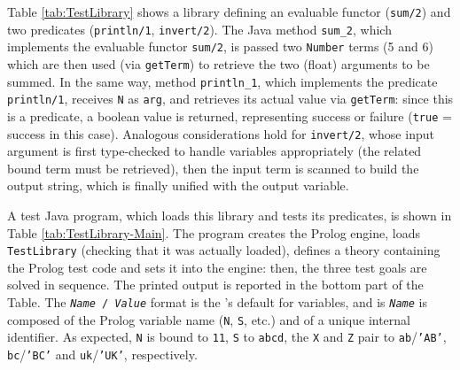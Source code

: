 Table \ref{tab:TestLibrary} shows a library defining an evaluable functor (\texttt{sum/2}) and two predicates (\texttt{println/1}, \texttt{invert/2}).
%
The Java method \texttt{sum\_2}, which implements the evaluable functor \texttt{sum/2}, is passed two \texttt{Number} terms (5 and 6) which are then used (via \texttt{getTerm}) to retrieve the two (float) arguments to be summed.
%
In the same way, method \texttt{println\_1}, which implements the predicate \texttt{println/1}, receives \texttt{N} as \texttt{arg}, and retrieves its actual value via \texttt{getTerm}: since this is a predicate, a boolean value is returned, representing success or failure (\texttt{true} = success in this case).
%
Analogous considerations hold for \texttt{invert/2}, whose input argument is first type-checked to handle variables appropriately (the related bound term must be retrieved), then the input term is scanned to build the output string, which is finally unified with the output variable.

A test Java program, which loads this library and tests its predicates, is shown in Table \ref{tab:TestLibrary-Main}.
%
The program creates the Prolog engine, loads \texttt{TestLibrary} (checking that it was actually loaded), defines a theory containing the Prolog test code and sets it into the engine: then, the three test goals are solved in sequence.
%
The printed output is reported in the bottom part of the Table.
The \texttt{\textit{Name} / \textit{Value}} format is the \tuprolog{}'s default for variables, and is \texttt{\textit{Name}} is composed of the Prolog variable name (\texttt{N}, \texttt{S}, etc.) and of a unique internal identifier.
%
As expected, \texttt{N} is bound to \texttt{11}, \texttt{S} to \texttt{abcd}, the \texttt{X} and \texttt{Z} pair to \texttt{ab}/\texttt{'AB'}, \texttt{bc}/\texttt{'BC'} and \texttt{uk}/\texttt{'UK'}, respectively.

